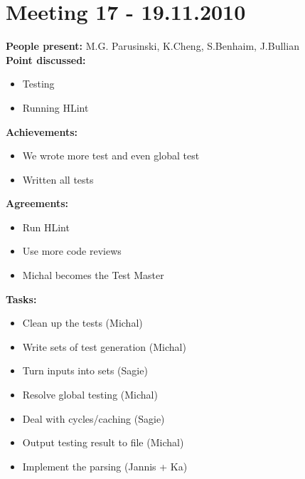 \documentclass[12pt]{article}
\begin{document}
\section*{Meeting 17 - 19.11.2010}
\textbf{People present:} M.G. Parusinski, K.Cheng, S.Benhaim, J.Bullian \\ 
\textbf{Point discussed:} 
\begin{itemize}
\item Testing
\item Running HLint
\end{itemize}
\textbf{Achievements:}
\begin{itemize}
\item We wrote more test and even global test
\item Written all tests
\end{itemize}
\textbf{Agreements:}
\begin{itemize}
\item Run HLint
\item Use more code reviews
\item Michal becomes the Test Master
\end{itemize}
\textbf{Tasks:}
\begin{itemize}
\item Clean up the tests (Michal) 
\item Write sets of test generation (Michal)
\item Turn inputs into sets (Sagie)
\item Resolve global testing (Michal)
\item Deal with cycles/caching (Sagie)
\item Output testing result to file (Michal)
\item Implement the parsing (Jannis + Ka)
\end{itemize}
\end{document}
